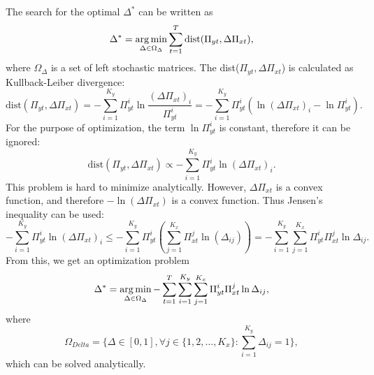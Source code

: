 The search for the optimal $\Delta^{*}$ can be written as
\begin{equation}
    \Delta^* = \operatorname*{arg\,min}_{\Delta \in \Omega_{\Delta}} \sum_{t=1}^T \text{dist}(\Pi_{yt}, \Delta\Pi_{xt}),
\end{equation}
where $\Omega_{\Delta}$ is a set of left stochastic matrices. The dist($\Pi_{yt}, \Delta\Pi_{xt}$) is calculated as Kullback-Leiber divergence\cite{Kullback1951}:
\begin{equation}
    \text{dist}(\Pi_{yt}, \Delta\Pi_{xt}) = - \sum_{i=1}^{K_y} \Pi_{yt}^i \ln\frac{(\Delta\Pi_{xt})_i}{\Pi_{yt}^i} = - \sum_{i=1}^{K_y} \Pi_{yt}^i (\ln (\Delta\Pi_{xt})_i - \ln \Pi_{yt}^i).
\end{equation}
For the purpose of optimization, the term $\ln \Pi_{yt}^i$ is constant, therefore it can be ignored:
\begin{equation}
    \text{dist}(\Pi_{yt}, \Delta\Pi_{xt}) \propto - \sum_{i=1}^{K_y} \Pi_{yt}^i \ln (\Delta\Pi_{xt})_i.
\end{equation}
This problem is hard to minimize analytically. However, $\Delta\Pi_{xt}$ is a convex function, and therefore $-\ln(\Delta\Pi_{xt})$ is a convex function. Thus Jensen's inequality can be used:
\begin{equation}
    - \sum_{i=1}^{K_y} \Pi_{yt}^i \ln (\Delta\Pi_{xt})_i \leq - \sum_{i=1}^{K_y} \Pi_{yt}^i ( \sum_{j=1}^{K_x} \Pi_{xt}^j \ln (\Delta_{ij}) ) = - \sum_{i=1}^{K_y} \sum_{j=1}^{K_x} \Pi_{yt}^i \Pi_{xt}^j \ln \Delta_{ij}.
\end{equation}
From this, we get an optimization problem
\begin{equation}
    \Delta^* = \operatorname*{arg\,min}_{\Delta \in \Omega_{\Delta}} - \sum_{t=1}^T \sum_{i=1}^{K_y} \sum_{j=1}^{K_x} \Pi_{yt}^i \Pi_{xt}^j \ln \Delta_{ij},
\end{equation}
where
\begin{equation}
    \Omega_{Delta} = \{ \Delta \in [0, 1], \forall j \in \{ 1, 2, \dots, K_x \} : \sum_{i=1}^{K_y} \Delta_{ij} = 1 \},
\end{equation}
which can be solved analytically.

